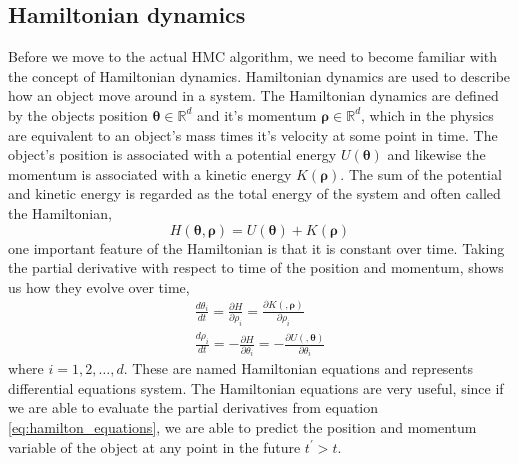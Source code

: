\subsection{Hamiltonian dynamics}
Before we move to the actual HMC algorithm, we need to become familiar with the concept of Hamiltonian dynamics. Hamiltonian dynamics are used to describe how an object move around in a system. The Hamiltonian dynamics are defined by the objects position $\boldsymbol{\theta}\in \mathbb{R}^d$ and it's momentum $\boldsymbol{\rho}\in \mathbb{R}^d$, which in the physics are equivalent to an object's mass times it's velocity at some point in time. The object's position is associated with a potential energy $U(\boldsymbol{\theta})$ and likewise the momentum is associated with a kinetic energy $K(\boldsymbol{\rho})$. The sum of the potential and kinetic energy is regarded as the total energy of the system and often called the Hamiltonian,
\begin{equation*}
H(\boldsymbol{\theta},\boldsymbol{\rho})=U(\boldsymbol{\theta})+K(\boldsymbol{\rho})    
\end{equation*}       
one important feature of the Hamiltonian is that it is constant over time. Taking the partial derivative with respect to time of the position and momentum, shows us how they evolve over time,
\begin{equation}\label{eq:hamilton_equations}
\begin{split}
\frac{d \theta_{i}}{d t}=\frac{\partial H}{\partial \rho_{i}}=\frac{\partial K(,\boldsymbol{\rho})}{\partial \rho_{i}} \\
\frac{d \rho_{i}}{d t}=-\frac{\partial H}{\partial \theta_{i}}=-\frac{\partial U(,\boldsymbol{\theta})}{\partial \theta_{i}}
\end{split}
\end{equation}
where $i=1,2, \ldots,d$. These are named Hamiltonian equations and represents differential equations system. The Hamiltonian equations are very useful, since if we are able to evaluate the partial derivatives from equation \ref{eq:hamilton_equations}, we are able to predict the position and momentum variable of the object at any point in the future $t^\prime>t$.
